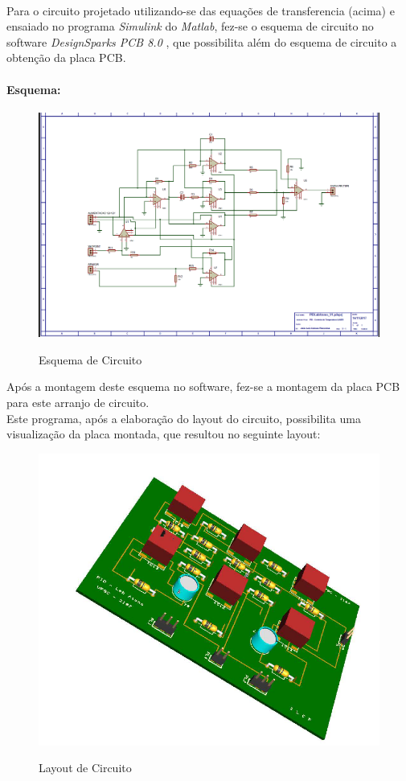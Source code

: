 \paragraph{}
Para o circuito projetado utilizando-se das equações de transferencia (acima) e ensaiado no programa \emph{Simulink} do \emph{Matlab\tiny\textregistered}, fez-se o esquema de circuito no software \emph {DesignSparks PCB 8.0 \tiny\textregistered}, que possibilita além do esquema de circuito a obtenção da placa PCB. \\

\paragraph{Esquema:}
\begin{figure}[H]
		\centering
		\includegraphics[width=0.8\linewidth]{./ima/esquemaCirucito-02.png}
		\label{fig:esquema}
		\caption{Esquema de Circuito}
	\end{figure}

Após a montagem deste esquema no software, fez-se a montagem da placa PCB para este arranjo de circuito. \\
Este programa, após a elaboração do layout do circuito, possibilita uma visualização da placa montada, que resultou no seguinte layout:\\
\begin{figure}[H]
		\centering
		\includegraphics[width=0.7\linewidth]{./ima/Layout-01.png}
		\label{fig:Layout da placa de circuito}
		\caption{Layout de Circuito}
	\end{figure}

